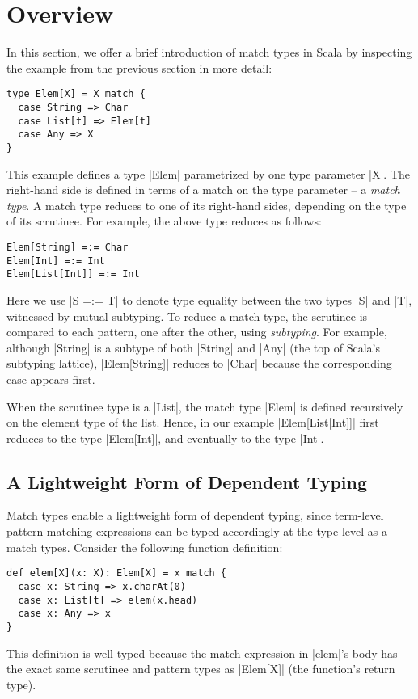 \section{Overview}
\label{sec:overview}

In this section, we offer a brief introduction of match types in Scala by inspecting the example from the previous section in more detail:
%
\begin{lstlisting}
type Elem[X] = X match {
  case String => Char
  case List[t] => Elem[t]
  case Any => X
}
\end{lstlisting}
%
This example defines a type |Elem| parametrized by one type parameter |X|. The right-hand side is defined in terms of a match on the type parameter -- a \emph{match type}.
A match type reduces to one of its right-hand sides, depending on the type of its scrutinee.
For example, the above type reduces as follows:
%
\begin{lstlisting}
Elem[String] =:= Char
Elem[Int] =:= Int
Elem[List[Int]] =:= Int
\end{lstlisting}
%
Here we use |S =:= T| to denote type equality between the two types |S| and |T|, witnessed by mutual subtyping.
To reduce a match type, the scrutinee is compared to each pattern, one after the other, using \emph{subtyping}.
For example, although |String| is a subtype of both |String| and |Any| (the top of Scala's subtyping lattice), |Elem[String]| reduces to |Char| because the corresponding case appears first.

When the scrutinee type is a |List|, the match type |Elem| is defined recursively on the element type of the list.
Hence, in our example |Elem[List[Int]]| first reduces to the type |Elem[Int]|, and eventually to the type |Int|.

\subsection{A Lightweight Form of Dependent Typing}
\label{subsec:a-lightweight-form-of-dependent-typing}

Match types enable a lightweight form of dependent typing, since term-level pattern matching expressions can be typed accordingly at the type level as a match types.
Consider the following function definition:
%
\begin{lstlisting}
def elem[X](x: X): Elem[X] = x match {
  case x: String => x.charAt(0)
  case x: List[t] => elem(x.head)
  case x: Any => x
}
\end{lstlisting}
%
This definition is well-typed because the match expression in |elem|'s body has the exact same scrutinee and pattern types as |Elem[X]| (the function's return type).

